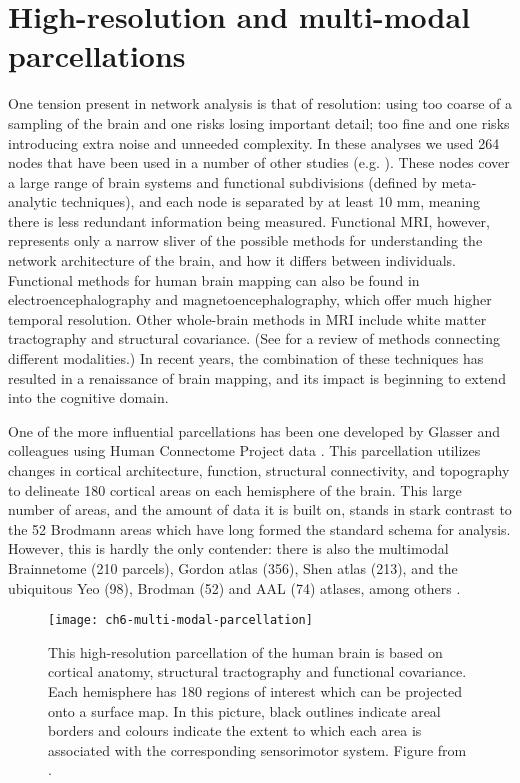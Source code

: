 \section{High-resolution and multi-modal parcellations}

One tension present in network analysis is that of resolution: using too coarse of a sampling of the brain and one risks losing important detail; too fine and one risks introducing extra noise and unneeded complexity. In these analyses we used 264 nodes that have been used in a number of other studies (e.g. \cite{Power2013, Cole2014}). These nodes cover a large range of brain systems and functional subdivisions (defined by meta-analytic techniques), and each node is separated by at least 10 mm, meaning there is less redundant information being measured. Functional MRI, however, represents only a narrow sliver of the possible methods for understanding the network architecture of the brain, and how it differs between individuals. Functional methods for human brain mapping can also be found in electroencephalography and magnetoencephalography, which offer much higher temporal resolution. Other whole-brain methods in MRI include white matter tractography and structural covariance. (See \cite{Sui2012} for a review of methods connecting different modalities.) In recent years, the combination of these techniques has resulted in a renaissance of brain mapping, and its impact is beginning to extend into the cognitive domain. 

One of the more influential parcellations has been one developed by Glasser and colleagues using Human Connectome Project data \citep{Glasser2016}. This parcellation utilizes changes in cortical architecture, function, structural connectivity, and topography to delineate 180 cortical areas on each hemisphere of the brain. This large number of areas, and the amount of data it is built on, stands in stark contrast to the 52 Brodmann areas which have long formed the standard schema for analysis. However, this is hardly the only contender: there is also the multimodal Brainnetome (210 parcels), Gordon atlas (356), Shen atlas (213), and the ubiquitous Yeo (98), Brodman (52) and AAL (74) atlases, among others \citep{Gordon2016, Fan2016, Shen2013, Yeo2011}. 

\begin{figure}[t]
	\centering
	\texttt{[image: ch6-multi-modal-parcellation]}
	\caption[Multi-modal parcellation of the human brain]{This high-resolution parcellation of the human brain is based on cortical anatomy, structural tractography and functional covariance. Each hemisphere has 180 regions of interest which can be projected onto a surface map. In this picture, black outlines indicate areal borders and colours indicate the extent to which each area is associated with the corresponding sensorimotor system. Figure from \citep{Glasser2016}.}
	\label{fig:ch6-multi-modal-parcellation}
\end{figure}

